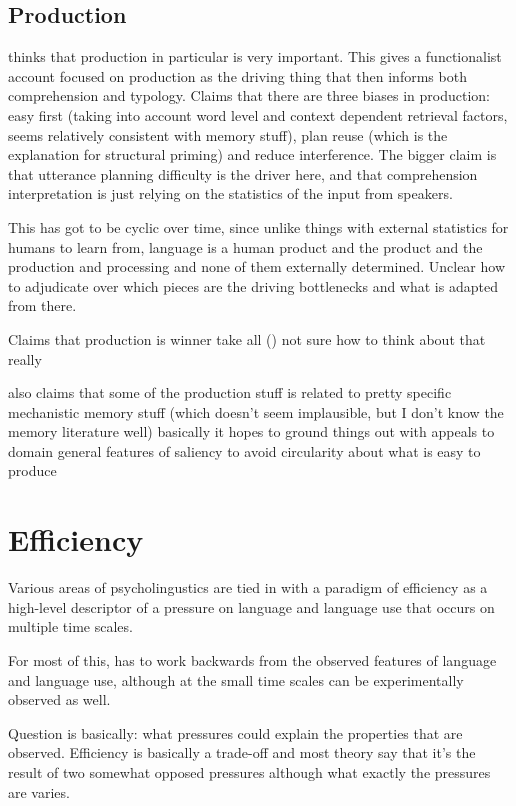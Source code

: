 \documentclass[]{article}
\begin{document}
\subsection{Production}

\cite{macdonald2013} thinks that production in particular is very important. This gives a functionalist account focused on production as the driving thing that then informs both comprehension and typology. Claims that there are three biases in production: easy first (taking into account word level and context dependent retrieval factors, seems relatively consistent with memory stuff), plan reuse (which is the explanation for structural priming) and reduce interference. The bigger claim is that utterance planning difficulty is the driver here, and that comprehension interpretation is just relying on the statistics of the input from speakers. 

This has got to be cyclic over time, since unlike things with external statistics for humans to learn from, language is a human product and the product and the production and processing and none of them externally determined. Unclear how to adjudicate over which pieces are the driving bottlenecks and what is adapted from there. 

Claims that production is winner take all (\cite{macdonald2013}) not sure how to think about that really 

\cite{macdonald2013} also claims that some of the production stuff is related to pretty specific mechanistic memory stuff (which doesn't seem implausible, but I don't know the memory literature well) basically it hopes to ground things out with appeals to domain general features of saliency to avoid circularity about what is easy to produce 



\section{Efficiency}

Various areas of psycholingustics are tied in with a paradigm of efficiency as a high-level descriptor of a pressure on language and language use that occurs on multiple time scales. 

For most of this, has to work backwards from the observed features of language and language use, although at the small time scales can be experimentally observed as well. 

Question is basically: what pressures could explain the properties that are observed. Efficiency is basically a trade-off and most theory say that it's the result of two somewhat opposed pressures although what exactly the pressures are varies. 
\end{document}

